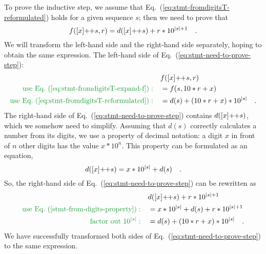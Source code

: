 To prove the inductive step, we assume that Eq.~(\ref{eq:stmt-fromdigitsT-reformulated})
holds for a given sequence $s$; then we need to prove that
\begin{equation}
f([x]\negmedspace+\negthickspace+s,r)=d([x]\negmedspace+\negthickspace+s)+r*10^{\left|s\right|+1}\quad.\label{eq:stmt-need-to-prove-step}
\end{equation}
We will transform the left-hand side and the right-hand side separately,
hoping to obtain the same expression. The left-hand side of Eq.~(\ref{eq:stmt-need-to-prove-step}):
\begin{align*}
 & f([x]\negmedspace+\negthickspace+s,r)\\
{\color{greenunder}\text{use Eq.~(\ref{eq:stmt-fromdigitsT-expand-f})}:}\quad & =f(s,10*r+x)\\
{\color{greenunder}\text{use Eq.~(\ref{eq:stmt-fromdigitsT-reformulated})}:}\quad & =d(s)+\left(10*r+x\right)*10^{\left|s\right|}\quad.
\end{align*}
The right-hand side of Eq.~(\ref{eq:stmt-need-to-prove-step}) contains
$d([x]\negmedspace+\negthickspace+s)$, which we somehow need to simplify.
Assuming that $d(s)$ correctly calculates a number from its digits,
we use a property of decimal notation: a digit $x$ in front of $n$
other digits has the value $x*10^{n}$. This property can be formulated
as an equation,
\begin{equation}
d([x]\negmedspace+\negthickspace+s)=x*10^{\left|s\right|}+d(s)\quad.\label{stmt-from-digits-property}
\end{equation}
So, the right-hand side of Eq.~(\ref{eq:stmt-need-to-prove-step})
can be rewritten as
\begin{align*}
 & d([x]\negmedspace+\negthickspace+s)+r*10^{\left|s\right|+1}\\
{\color{greenunder}\text{use Eq.~(\ref{stmt-from-digits-property})}:}\quad & =x*10^{\left|s\right|}+d(s)+r*10^{\left|s\right|+1}\\
{\color{greenunder}\text{factor out }10^{\left|s\right|}:}\quad & =d(s)+\left(10*r+x\right)*10^{\left|s\right|}\quad.
\end{align*}
We have successfully transformed both sides of Eq.~(\ref{eq:stmt-need-to-prove-step})
to the same expression.

